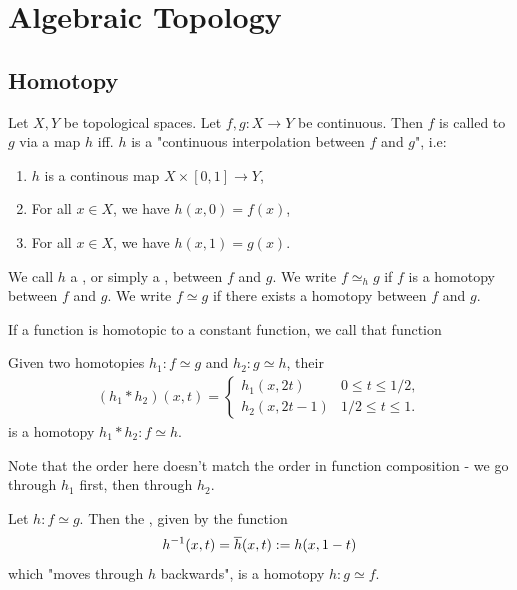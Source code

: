 \part{Algebraic Topology}
\chapter{Homotopy}
\begin{importantdefinition}{}{}
	Let $X,Y$ be topological spaces. Let $f,g : X \to Y$ be continuous. Then $f$ is called  to $g$ via a map $h$ iff. $h$ is a "continuous interpolation between $f$ and $g$", i.e:
	\begin{enumerate}
		\item $h$ is a continous map $X \times [0,1] \to Y$,
		\item For all $x \in X$, we have $h(x,0) = f(x)$,
		\item For all $x \in X$, we have $h(x,1) = g(x)$.
	\end{enumerate}
	We call $h$ a , or simply a , between $f$ and $g$. We write $f \simeq_h g$ if $f$ is a homotopy between $f$ and $g$. We write $f \simeq g$ if there exists a homotopy between $f$ and $g$.
\end{importantdefinition}
\begin{definition}
	If a function is homotopic to a constant function, we call that function 
\end{definition}
\begin{proposition}
	Given two homotopies $h_1: f \simeq g$ and $h_2 : g \simeq h$, their 
	\begin{align*}
		(h_1 * h_2)(x,t) =
		\begin{cases}
			h_1(x,2t) & 0 \leq t \leq 1/2,\\
			h_2(x,2t - 1) & 1/2 \leq t \leq 1.
		\end{cases}
	\end{align*}
	is a homotopy $h_1 * h_2 : f \simeq h$.
\end{proposition}
Note that the order here doesn't match the order in function composition - we go through $h_1$ first, then through $h_2$.
\begin{proposition}
	Let $h : f \simeq g$. Then the , given by the function
	\begin{align*}
		h^{-1}(x,t) = \overline{{h}}(x,t) := h(x,1-t)
	\end{align*}
	which "moves through $h$ backwards", is a homotopy $h : g \simeq f$.
\end{proposition} 
